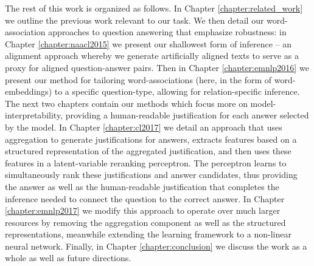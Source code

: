 The rest of this work is organized as follows.  In Chapter \ref{chapter:related_work} we outline the previous work relevant to our task.
We then detail our word-association approaches to question answering that emphasize robustness: in Chapter \ref{chapter:naacl2015} we present our shallowest form of inference -- an alignment approach whereby we generate artificially aligned texts to serve as a proxy for aligned question-answer pairs.  Then in Chapter \ref{chapter:emnlp2016} we present our method for tailoring word-associations (here, in the form of word-embeddings) to a specific question-type, allowing for relation-specific inference.  The next two chapters contain our methods which focus more on model-interpretability, providing a human-readable justification for each answer selected by the model.  In Chapter \ref{chapter:cl2017} we detail an approach that uses aggregation to generate justifications for answers, extracts features based on a structured representation of the aggregated justification, and then uses these features in a latent-variable reranking perceptron.  The perceptron learns to simultaneously rank these justifications and answer candidates, thus providing the answer as well as the human-readable justification that completes the inference needed to connect the question to the correct answer.  In Chapter \ref{chapter:emnlp2017} we modify this approach to operate over much larger resources by removing the aggregation component as well as the structured representations, meanwhile extending the learning framework to a non-linear neural network.  Finally, in Chapter \ref{chapter:conclusion} we discuss the work as a whole as well as future directions.
